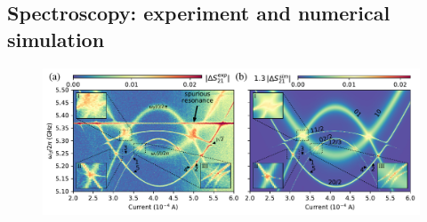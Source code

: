\documentclass[%
 aps, prx,
 amsmath,amssymb,
 reprint,%
superscriptaddress
]{revtex4-2}
\begin{document}
\subsection{\label{sec:level1} Spectroscopy: experiment and numerical simulation}

\begin{figure}
	
	\centering
	\includegraphics[width=\linewidth]{main_picture}
	

\end{figure}
\end{document}
